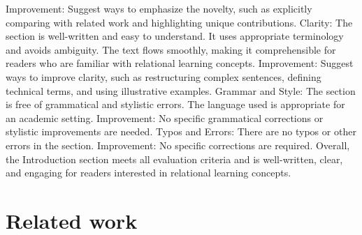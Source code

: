 \documentclass{article}%
\begin{document}
\newline%
Improvement:\newline%
\newline%
Suggest ways to emphasize the novelty, such as explicitly comparing with related work and highlighting unique contributions.\newline%
\newline%
Clarity:\newline%
\newline%
The section is well{-}written and easy to understand. It uses appropriate terminology and avoids ambiguity. The text flows smoothly, making it comprehensible for readers who are familiar with relational learning concepts.\newline%
\newline%
Improvement:\newline%
\newline%
Suggest ways to improve clarity, such as restructuring complex sentences, defining technical terms, and using illustrative examples.\newline%
\newline%
Grammar and Style:\newline%
\newline%
The section is free of grammatical and stylistic errors. The language used is appropriate for an academic setting.\newline%
\newline%
Improvement:\newline%
\newline%
No specific grammatical corrections or stylistic improvements are needed.\newline%
\newline%
Typos and Errors:\newline%
\newline%
There are no typos or other errors in the section.\newline%
\newline%
Improvement:\newline%
\newline%
No specific corrections are required.\newline%
\newline%
Overall, the Introduction section meets all evaluation criteria and is well{-}written, clear, and engaging for readers interested in relational learning concepts.

%
\clearpage%
\section{Related work}%
\label{sec:Relatedwork}%
\end{document}
